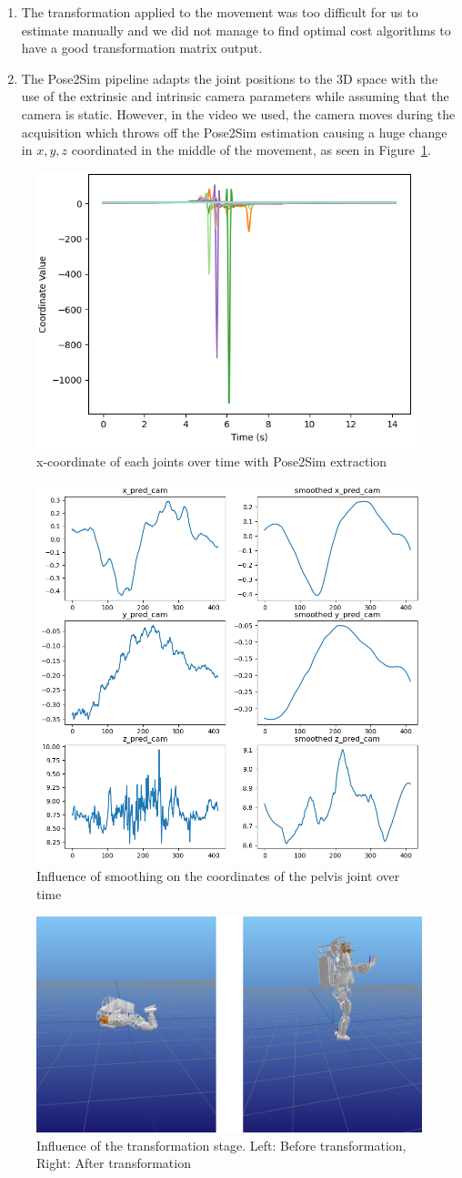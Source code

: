 \documentclass{amsart}
\theoremstyle{definition}
\theoremstyle{plain}
\begin{document}
\begin{enumerate}
    \item The transformation applied to the movement was too difficult for us to estimate manually and we did not manage to find optimal cost algorithms to have a good transformation matrix output.
    \item The Pose2Sim pipeline adapts the joint positions to the 3D space with the use of the extrinsic and intrinsic camera parameters while assuming that the camera is static. However, in the video we used, the camera moves during the acquisition which throws off the Pose2Sim estimation causing a huge change in $x,y,z$ coordinated in the middle of the movement, as seen in Figure~\ref{fig:x_coord_pose2sim}.
\end{enumerate}
\begin{figure}
  \includegraphics[width = 0.33 \columnwidth]{img/x_coord_pose2sim.png}
  \caption{x-coordinate of each joints over time with Pose2Sim extraction}\label{fig:x_coord_pose2sim}
\end{figure}
\begin{figure}
  \includegraphics[width = 0.5 \columnwidth]{img/influence_of_smoothing.png}
  \caption{Influence of smoothing on the coordinates of the pelvis joint over time}\label{fig:influence_of_smoothing}
\end{figure}
\begin{figure}
  \includegraphics[width = 0.75 \columnwidth]{img/influence_transformation.png}
  \caption{Influence of the transformation stage. Left: Before transformation, Right: After transformation}\label{fig:influence_transformation}
\end{figure}
\end{document}
